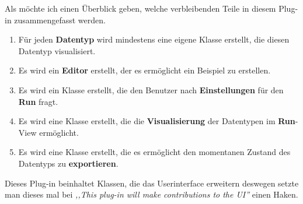 \documentclass[10pt,a4paper]{article}
\begin{document}
Als möchte ich einen Überblick geben, welche verbleibenden Teile in diesem Plug-in zusammengefasst werden.

\begin{enumerate}
\item Für jeden \textbf{Datentyp} wird mindestens eine eigene Klasse erstellt, die diesen Datentyp visualisiert.

\item Es wird ein \textbf{Editor} erstellt, der es ermöglicht ein Beispiel zu erstellen.

\item Es wird ein Klasse erstellt, die den Benutzer nach \textbf{Einstellungen} für den \textbf{Run} fragt.

\item Es wird eine Klasse erstellt, die die \textbf{Visualisierung} der Datentypen im \textbf{Run}-View ermöglicht.

\item Es wird eine Klasse erstellt, die es ermöglicht den momentanen Zustand des Datentyps zu \textbf{exportieren}.

 
\end{enumerate}

Dieses Plug-in beinhaltet Klassen, die das Userinterface erweitern deswegen setzte man dieses mal bei \textit{,,This plug-in will make contributions to the UI''} einen Haken.
\end{document}
